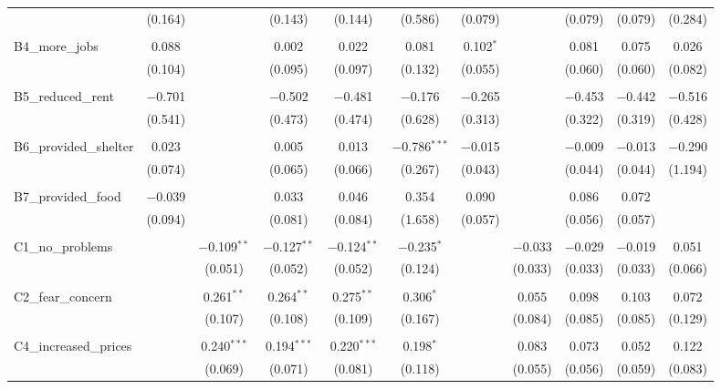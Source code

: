 \begin{table}[H]
\begin{tabular}{@{\extracolsep{4pt}}lcccccccccc}
  & (0.164) &  & (0.143) & (0.144) & (0.586) & (0.079) &  & (0.079) & (0.079) & (0.284) \\ 
  & & & & & & & & & & \\ 
 B4\_more\_jobs & 0.088 &  & 0.002 & 0.022 & 0.081 & 0.102$^{*}$ &  & 0.081 & 0.075 & 0.026 \\ 
  & (0.104) &  & (0.095) & (0.097) & (0.132) & (0.055) &  & (0.060) & (0.060) & (0.082) \\ 
  & & & & & & & & & & \\ 
 B5\_reduced\_rent & $-$0.701 &  & $-$0.502 & $-$0.481 & $-$0.176 & $-$0.265 &  & $-$0.453 & $-$0.442 & $-$0.516 \\ 
  & (0.541) &  & (0.473) & (0.474) & (0.628) & (0.313) &  & (0.322) & (0.319) & (0.428) \\ 
  & & & & & & & & & & \\ 
 B6\_provided\_shelter & 0.023 &  & 0.005 & 0.013 & $-$0.786$^{***}$ & $-$0.015 &  & $-$0.009 & $-$0.013 & $-$0.290 \\ 
  & (0.074) &  & (0.065) & (0.066) & (0.267) & (0.043) &  & (0.044) & (0.044) & (1.194) \\ 
  & & & & & & & & & & \\ 
 B7\_provided\_food & $-$0.039 &  & 0.033 & 0.046 & 0.354 & 0.090 &  & 0.086 & 0.072 &  \\ 
  & (0.094) &  & (0.081) & (0.084) & (1.658) & (0.057) &  & (0.056) & (0.057) &  \\ 
  & & & & & & & & & & \\ 
 C1\_no\_problems &  & $-$0.109$^{**}$ & $-$0.127$^{**}$ & $-$0.124$^{**}$ & $-$0.235$^{*}$ &  & $-$0.033 & $-$0.029 & $-$0.019 & 0.051 \\ 
  &  & (0.051) & (0.052) & (0.052) & (0.124) &  & (0.033) & (0.033) & (0.033) & (0.066) \\ 
  & & & & & & & & & & \\ 
 C2\_fear\_concern &  & 0.261$^{**}$ & 0.264$^{**}$ & 0.275$^{**}$ & 0.306$^{*}$ &  & 0.055 & 0.098 & 0.103 & 0.072 \\ 
  &  & (0.107) & (0.108) & (0.109) & (0.167) &  & (0.084) & (0.085) & (0.085) & (0.129) \\ 
  & & & & & & & & & & \\ 
 C4\_increased\_prices &  & 0.240$^{***}$ & 0.194$^{***}$ & 0.220$^{***}$ & 0.198$^{*}$ &  & 0.083 & 0.073 & 0.052 & 0.122 \\ 
  &  & (0.069) & (0.071) & (0.081) & (0.118) &  & (0.055) & (0.056) & (0.059) & (0.083) \\ 

\end{tabular}
\end{table}

